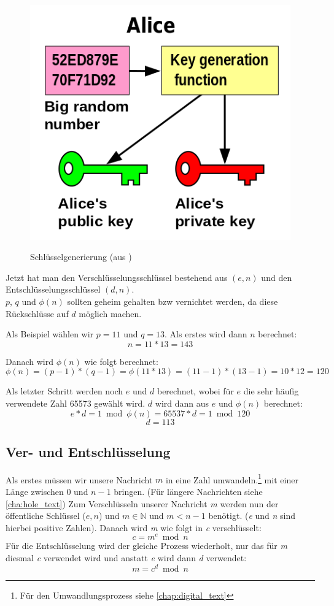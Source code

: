 \documentclass[12pt,a4paper]{scrartcl}
\begin{document}
\begin{figure}[h]
\centering
\includegraphics[scale=0.5]{Orange_blue_public_private_keygeneration} \\
\caption{Schlüsselgenerierung (aus \cite{wikipedia_keygen})}
\label{fig:figure1}
\end{figure}

Jetzt hat man den Verschlüsselungsschlüssel bestehend aus $(e, n)$ und den Entschlüsselungsschlüssel $(d, n)$. \\
$p$, $q$ und $\phi(n)$ sollten geheim gehalten bzw vernichtet werden, da diese Rückschlüsse auf $d$ möglich machen.

Als Beispiel wählen wir $p=11$ und $q=13$.
Als erstes wird dann $n$ berechnet:
$$n = 11*13 = 143$$

Danach wird $\phi (n)$ wie folgt berechnet:
$$\phi(n) = (p-1)*(q-1) = \phi(11*13) = (11 - 1) * (13-1) = 10 * 12 = 120$$

Als letzter Schritt werden noch $e$ und $d$ berechnet, wobei für $e$ die sehr häufig verwendete Zahl 65573 gewählt wird. $d$ wird dann aus $e$ und $\phi(n)$ berechnet:
$$e * d = 1 \bmod \phi(n) = 65537 * d = 1 \bmod 120$$
$$ d = 113$$


	\subsection{Ver- und Entschlüsselung}
	Als erstes müssen wir unsere Nachricht $m$ in eine Zahl umwandeln.\footnote{Für den Umwandlungsprozess siehe \ref{chap:digital_text}} mit einer Länge zwischen 0 und $n-1$ bringen. (Für längere Nachrichten siehe \ref{cha:hole_text})
	Zum Verschlüsseln unserer Nachricht \textit{m} werden nun der öffentliche Schlüssel ($e, n$) und $m \in \mathbb{N}$ und $m < n-1$ benötigt. (\textit{e} und \textit{n} sind hierbei positive Zahlen).\cite[6]{rsaOriginalPaper} Danach wird \textit{m} wie folgt in \textit{c} verschlüsselt: 
	$$c = m^e \bmod n$$
	Für die Entschlüsselung wird der gleiche Prozess wiederholt, nur das für \textit{m} diesmal \textit{c} verwendet wird und anstatt \textit{e} wird dann \textit{d} verwendet:
	$$m = c^d \bmod n$$
	
\end{document}
